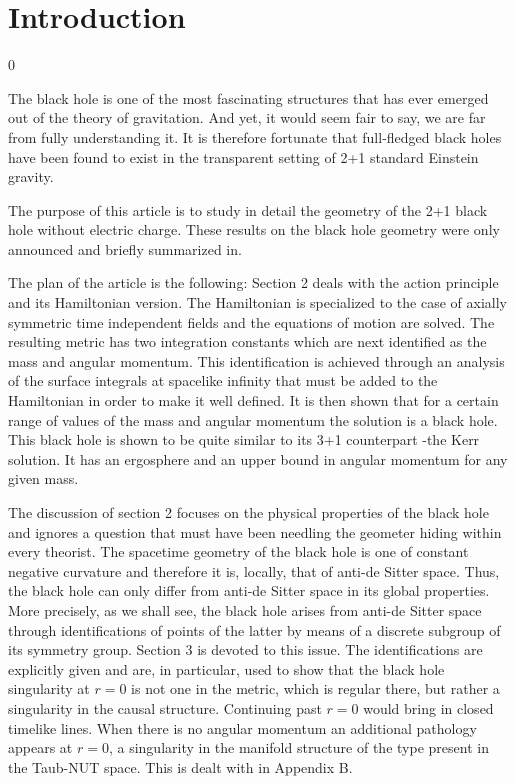 \documentclass[12pt]{article}
\newcounter{c1} \newcounter{c2}
\begin{document}
\bigskip
\bigskip
\vfill\break

\newpage
\section{Introduction}
\setcounter{equation} 0

The black hole is one of the most fascinating structures that
has ever emerged out of the theory of gravitation. And yet, it would
seem fair to say, we are far from fully understanding
it. It is therefore fortunate that full-fledged black holes have
been found to exist\cite{1} in the transparent setting of 2+1
standard Einstein gravity\cite{2}.

The purpose of this article is to study in detail the geometry
of the 2+1 black hole without electric charge\cite{3}. These results on the
black
 hole geometry were only announced and briefly summarized in\cite{1}.

The plan of the article is the
following: Section 2 deals with the action principle and its
Hamiltonian version.  The Hamiltonian is specialized to the case
of axially symmetric time independent fields and the equations
of motion are solved. The resulting metric has two integration
constants which are next identified as the mass and angular
momentum. This identification is achieved through an analysis of
the surface integrals at spacelike infinity that must be added
to the Hamiltonian in order to make it well defined. It is then
shown that for a certain range of values of the mass and angular
momentum the solution is a black hole. This black hole is shown
to be quite similar to its 3+1 counterpart -the Kerr solution.
It has an ergosphere and an upper bound in angular momentum for
any given mass.

The discussion of section 2 focuses on the physical properties of
the black hole and ignores a question that must have been
needling the geometer hiding within every theorist. The
spacetime geometry of the black hole is one of constant negative
curvature and therefore it is, locally, that of anti-de Sitter
space. Thus, the black hole can only differ from anti-de Sitter
space in its global properties. More precisely, as we shall see, the
black hole arises from anti-de Sitter space through
identifications of points of the latter by means of a discrete
subgroup of its symmetry group\cite{4}.
Section 3 is devoted to this issue. The
identifications are explicitly given and are, in particular,
used to show that the black hole singularity at $r = 0$ is
not one in the metric, which is regular there, but rather a singularity in
the causal structure.  Continuing past $r = 0$ would bring in closed
timelike lines. When there is no angular momentum an additional
pathology appears at $r=0$, a singularity in the manifold
structure of the type present in the Taub-NUT space. This is
dealt with in Appendix B.
\end{document}
